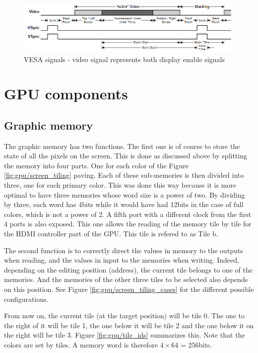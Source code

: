 \begin{figure}[H]
    \centering
    \includegraphics[width=\linewidth]{Chapter4-GPU_CLKU/res/vesa_signals.PNG}
    \caption{VESA signals - video signal represents both display enable signals}
    \label{fig:gpu/vesa_signals}
\end{figure}

\section{GPU components}

\subsection{Graphic memory}

The graphic memory has two functions. The first one is of course to store the state of all the 
pixels on the screen. This is done as discussed above by splitting the memory into four parts. One 
for each color of the Figure \ref{fig:gpu/screen_tiling} paving. Each of these sub-memories is then divided into three, one for 
each primary color. This was done this way because it is more optimal to have three memories whose 
word size is a power of two. By dividing by three, each word has 4bits while it would have had 
12bits in the case of full colors, which is not a power of 2. A fifth port with a different clock 
from the first 4 ports is also exposed. This one allows the reading of the memory tile by tile for 
the HDMI controller part of the GPU. This tile is refered to as Tile b.

The second function is to correctly direct the values in memory to the outputs when reading, and 
the values in input to the memories when writing. Indeed, depending on the editing position (address), the 
current tile belongs to one of the memories. And the memories of the other three tiles to be 
selected also depends on this position. See Figure \ref{fig:gpu/screen_tiling_cases} for the different possible configurations. 

From now on, the current tile (at the target position) will be tile 0. The one to the right of it
will be tile 1, the one below it will be tile 2 and the one below it on the right will be tile 3. 
Figure \ref{fig:gpu/tile_ids} summarizes this. Note that the colors are set by tiles. A memory word 
is therefore $4 \times 64$ = 256bits.

